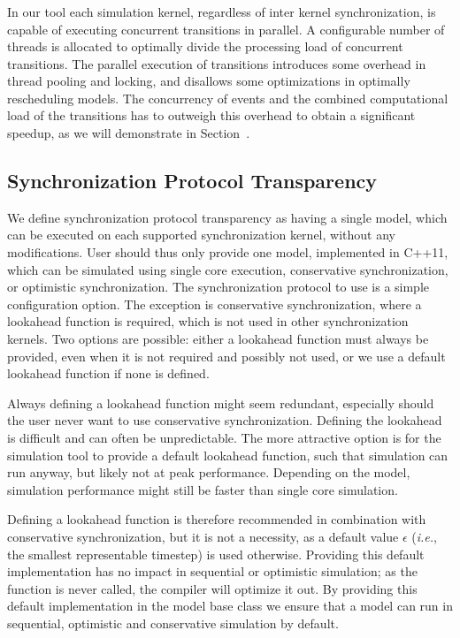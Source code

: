 \subsubsection{\pSim}
In our tool each simulation kernel, regardless of inter kernel synchronization, is capable of executing concurrent transitions in parallel. A configurable number of threads is allocated to optimally divide the processing load of concurrent transitions. The parallel execution of transitions introduces some overhead in thread pooling and locking, and disallows some optimizations in optimally rescheduling models. The concurrency of events and the combined computational load of the transitions has to outweigh this overhead to obtain a significant speedup, as we will demonstrate in Section~\textsc{}.

\subsection{Synchronization Protocol Transparency}
We define synchronization protocol transparency as having a single model, which can be executed on each supported synchronization kernel, without any modifications.
User should thus only provide one model, implemented in C++11, which can be simulated using single core execution, conservative synchronization, or optimistic synchronization.
The synchronization protocol to use is a simple configuration option.
The exception is conservative synchronization, where a lookahead function is required, which is not used in other synchronization kernels.
Two options are possible: either a lookahead function must always be provided, even when it is not required and possibly not used, or we use a default lookahead function if none is defined.

Always defining a lookahead function might seem redundant, especially should the user never want to use conservative synchronization.
Defining the lookahead is difficult and can often be unpredictable.
The more attractive option is for the simulation tool to provide a default lookahead function, such that simulation can run anyway, but likely not at peak performance.
Depending on the model, simulation performance might still be faster than single core simulation. 

Defining a lookahead function is therefore recommended in combination with conservative synchronization, but it is not a necessity, as a default value $\epsilon$ (\textit{i.e.}, the smallest representable timestep) is used otherwise.
Providing this default implementation has no impact in sequential or optimistic simulation; as the function is never called, the compiler will optimize it out.
By providing this default implementation in the model base class we ensure that a model can run in sequential, optimistic and conservative simulation by default.

